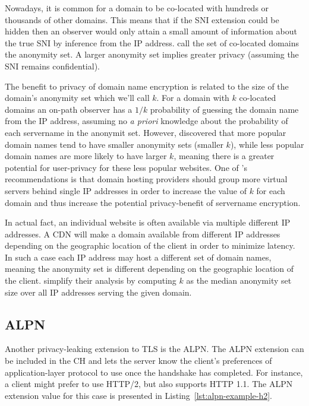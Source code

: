 Nowadays, it is common for a domain to be co-located with hundreds or thousands of other domains.
This means that if the \ac{SNI} extension could be hidden then an observer would only attain a small amount of information about the true \ac{SNI} by inference from the \ac{IP} address.
\cite{esni} call the set of co-located domains the anonymity set.
A larger anonymity set implies greater privacy (assuming the \ac{SNI} remains confidential).

The benefit to privacy of domain name encryption is related to the size of the domain's anonymity set which we'll call $k$. For a domain with $k$ co-located domains an on-path observer has a $1/k$ probability of guessing the domain name from the \ac{IP} address,
assuming no {\em a priori} knowledge about the probability of each servername in the anonymit set.
However, \cite{hoang-2020-assessing-privacy-benefits-sni-encryption} discovered that more popular domain names tend to have smaller anonymity sets (smaller $k$), while less popular domain names are more likely to have larger $k$, meaning there is a greater potential for user-privacy for these less popular websites.
One of \citeauthor{hoang-2020-assessing-privacy-benefits-sni-encryption}'s \citeyear{hoang-2020-assessing-privacy-benefits-sni-encryption} recommendations is that domain hosting providers should group more virtual servers behind single \ac{IP} addresses in order to increase the value of $k$ for each domain and thus increase the potential privacy-benefit of servername encryption.

In actual fact, an individual website is often available via multiple different \ac{IP} addresses. A \ac{CDN} will make a domain available from different \ac{IP} addresses depending on the geographic location of the client in order to minimize latency. In such a case each \ac{IP} address may host a different set of domain names, meaning the anonymity set is different depending on the geographic location of the client. \cite{hoang-2020-assessing-privacy-benefits-sni-encryption} simplify their analysis by computing $k$ as the median anonymity set size over all \ac{IP} addresses serving the given domain.

\subsection{ALPN}
Another privacy-leaking  extension to \ac{TLS} is the \ac{ALPN}. The \ac{ALPN} extension can be
included in the \ac{CH} and lets the server know the client's preferences
of application-layer protocol to use once the handshake has completed.
For instance, a client might prefer to use \ac{HTTP}/2, but also supports \ac{HTTP} 1.1.
The \ac{ALPN} extension value for this case is presented in Listing~\ref{lst:alpn-example-h2}.

